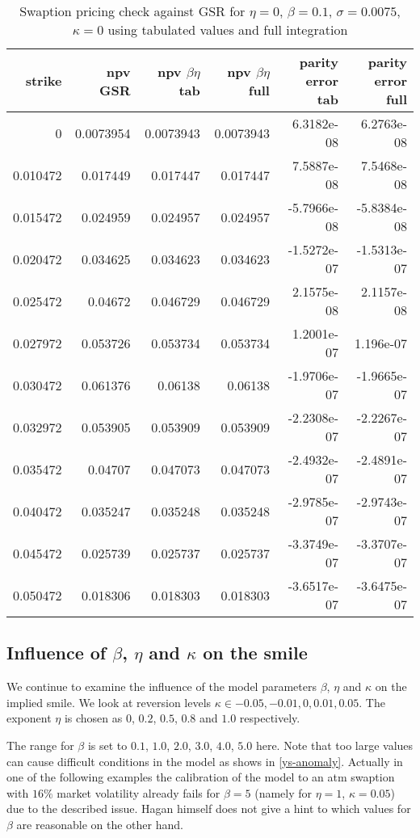 \documentclass{amsart}
\theoremstyle{plain}
\numberwithin{equation}{section}
\begin{document}
\begin{table}[ht]
\caption{Swaption pricing check against GSR for $\eta=0$, $\beta=0.1$, $\sigma=0.0075$, $\kappa=0$ using tabulated values and full integration}
\begin{tabular}{r | r | r | r | r | r}
strike & npv GSR & npv $\beta\eta$ tab & npv $\beta\eta$ full & parity error tab & parity error full \\ \hline
0 & 0.0073954 & 0.0073943 & 0.0073943 & 6.3182e-08 & 6.2763e-08 \\
0.010472 & 0.017449 & 0.017447 & 0.017447 & 7.5887e-08 & 7.5468e-08 \\
0.015472 & 0.024959 & 0.024957 & 0.024957 & -5.7966e-08 & -5.8384e-08 \\
0.020472 & 0.034625 & 0.034623 & 0.034623 & -1.5272e-07 & -1.5313e-07 \\
0.025472 & 0.04672 & 0.046729 & 0.046729 & 2.1575e-08 & 2.1157e-08 \\
0.027972 & 0.053726 & 0.053734 & 0.053734 & 1.2001e-07 & 1.196e-07 \\
0.030472 & 0.061376 & 0.06138 & 0.06138 & -1.9706e-07 & -1.9665e-07 \\
0.032972 & 0.053905 & 0.053909 & 0.053909 & -2.2308e-07 & -2.2267e-07 \\
0.035472 & 0.04707 & 0.047073 & 0.047073 & -2.4932e-07 & -2.4891e-07 \\
0.040472 & 0.035247 & 0.035248 & 0.035248 & -2.9785e-07 & -2.9743e-07 \\
0.045472 & 0.025739 & 0.025737 & 0.025737 & -3.3749e-07 & -3.3707e-07 \\
0.050472 & 0.018306 & 0.018303 & 0.018303 & -3.6517e-07 & -3.6475e-07
\end{tabular}
\label{hwcase}
\end{table}

\subsection{Influence of $\beta$, $\eta$ and $\kappa$ on the smile}

We continue to examine the influence of the model parameters $\beta$, $\eta$ and $\kappa$ on the implied smile. We look at reversion levels $\kappa \in { -0.05, -0.01, 0, 0.01 ,0.05 }$. The exponent $\eta$ is chosen as $0$, $0.2$, $0.5$, $0.8$ and $1.0$ respectively. 

The range for $\beta$ is set to $0.1$, $1.0$, $2.0$, $3.0$, $4.0$, $5.0$ here. Note that too large values can cause difficult conditions in the model as shows in \ref{ys-anomaly}. Actually in one of the following examples the calibration of the model to an atm swaption with $16\%$ market volatility already fails for $\beta=5$ (namely for $\eta=1$, $\kappa=0.05$) due to the described issue. Hagan himself does not give a hint to which values for $\beta$ are reasonable on the other hand.
\end{document}
